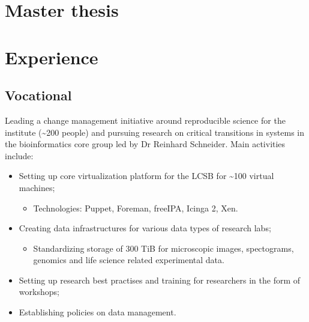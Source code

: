 \documentclass[11pt,a4paper,nolmodern, sans]{moderncv}        %
\begin{document}

\section{Master thesis}


\section{Experience}
\subsection{Vocational}


{Leading a change management initiative around reproducible science for the institute (\textasciitilde 200 people) and pursuing research on critical transitions in systems in the bioinformatics core group led by Dr Reinhard Schneider. \newline{} Main activities include:
\begin{itemize}
	\item Setting up core virtualization platform for the LCSB for \textasciitilde 100 virtual machines;
	\begin{itemize}
		\item Technologies: Puppet, Foreman, freeIPA, Icinga 2, Xen.
	\end{itemize}
	\item Creating data infrastructures for various data types of research labs;
  \begin{itemize}
		\item Standardizing storage of 300 TiB for microscopic images, spectograms, genomics and life science related experimental data.
	\end{itemize}
	\item Setting up research best practises and training for researchers in the form of workshops;
	\item Establishing policies on data management.
\end{itemize}}
\end{document}
